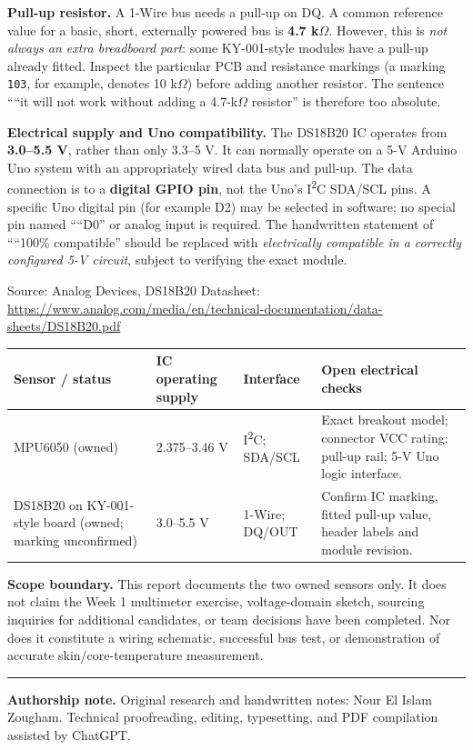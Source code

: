\documentclass[11pt,a4paper]{article}
\newcommand{\sect}[1]{\vspace{6pt}{\color{navy}\large\bfseries #1}\par\vspace{2pt}}
\newcommand{\source}[1]{{\footnotesize\color{teal}Source: #1}}
\begin{document}
\textbf{Pull-up resistor.} A 1-Wire bus needs a pull-up on DQ. A common reference value for a basic, short, externally powered bus is \textbf{4.7 k\(\Omega\)}. However, this is \emph{not always an extra breadboard part}: some KY-001-style modules have a pull-up already fitted. Inspect the particular PCB and resistance markings (a marking \texttt{103}, for example, denotes 10 k\(\Omega\)) before adding another resistor. The sentence ````it will not work without adding a 4.7-k\(\Omega\) resistor'' is therefore too absolute.

\textbf{Electrical supply and Uno compatibility.} The DS18B20 IC operates from \textbf{3.0--5.5 V}, rather than only 3.3--5 V. It can normally operate on a 5-V Arduino Uno system with an appropriately wired data bus and pull-up. The data connection is to a \textbf{digital GPIO pin}, not the Uno's I\textsuperscript{2}C SDA/SCL pins. A specific Uno digital pin (for example D2) may be selected in software; no special pin named ````D0'' or analog input is required. The handwritten statement of ````100\% compatible'' should be replaced with \emph{electrically compatible in a correctly configured 5-V circuit}, subject to verifying the exact module.

\source{Analog Devices, DS18B20 Datasheet: \url{https://www.analog.com/media/en/technical-documentation/data-sheets/DS18B20.pdf}}

\sect{3. Consolidated Week 1 interface shortlist}
\small
\begin{tabularx}{\linewidth}{@{}p{29mm}p{29mm}p{24mm}X@{}}\toprule
\textbf{Sensor / status} & \textbf{IC operating supply} & \textbf{Interface} & \textbf{Open electrical checks}\\\midrule
MPU6050 (owned) & 2.375--3.46 V & I\textsuperscript{2}C; SDA/SCL & Exact breakout model; connector VCC rating; pull-up rail; 5-V Uno logic interface.\\
DS18B20 on KY-001-style board (owned; marking unconfirmed) & 3.0--5.5 V & 1-Wire; DQ/OUT & Confirm IC marking, fitted pull-up value, header labels and module revision.\\
\bottomrule
\end{tabularx}\normalsize

\textbf{Scope boundary.} This report documents the two owned sensors only. It does not claim the Week 1 multimeter exercise, voltage-domain sketch, sourcing inquiries for additional candidates, or team decisions have been completed. Nor does it constitute a wiring schematic, successful bus test, or demonstration of accurate skin/core-temperature measurement.

\vspace{7pt}\hrule\vspace{3pt}
{\footnotesize\textbf{Authorship note.} Original research and handwritten notes: Nour El Islam Zougham. Technical proofreading, editing, typesetting, and PDF compilation assisted by ChatGPT.}
\end{document}
